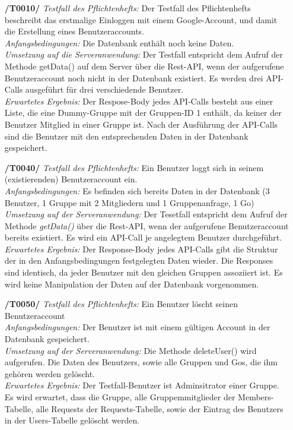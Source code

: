 \documentclass[11pt,a4paper]{scrartcl}
\begin{document}
\begin{enumerate}
	\item[\textbf{/T0010/}]
	\textit{Testfall des Pflichtenhefts: }Der Testfall des Pflichtenhefts beschreibt das erstmalige Einloggen mit einem Google-Account, und damit die Erstellung eines Benutzeraccounts.\\
	\textit{Anfangsbedingungen: }Die Datenbank enthält noch keine Daten.\\
	\textit{Umsetzung auf die Serveranwendung: }Der Testfall entspricht dem Aufruf der Methode getData() auf dem Server über die Rest-API, wenn der aufgerufene Benutzeraccount noch nicht in der Datenbank existiert. Es werden drei API-Calls ausgeführt für drei verschiedende Benutzer.\\
	\textit{Erwartetes Ergebnis: } Der Respose-Body jedes API-Calls besteht aus einer Liste, die eine Dummy-Gruppe mit der Gruppen-ID 1 enthält, da keiner der Benutzer Mitglied in einer Gruppe ist. Nach der Ausführung der API-Calls sind die Benutzer mit den entsprechenden Daten in der Datenbank gespeichert.
	
	\item[\textbf{/T0040/}]
	\textit{Testfall des Pflichtenhefts: }Ein Benutzer loggt sich in seinem (existierenden) Benutzeraccount ein.\\
	\textit{Anfangsbedingungen: }Es befinden sich bereits Daten in der Datenbank (3 Benutzer, 1 Gruppe mit 2 Mitgliedern und 1 Gruppenanfrage, 1 Go)\\
	\textit{Umsetzung auf der Serveranwendung: }Der Tesetfall entspricht dem Aufruf der Methode \textit{getData()} über die Rest-API, wenn der aufgerufene Benutzeraccount bereits existiert. Es wird ein API-Call je angelegtem Benutzer durchgeführt.\\
	\textit{Erwartetes Ergebnis: }Der Response-Body jedes API-Calls gibt die Struktur der in den Anfangsbedingungen festgelegten Daten wieder. Die Responses sind identisch, da jeder Benutzer mit den gleichen Gruppen assoziiert ist. Es wird keine Manipulation der Daten auf der Datenbank vorgenommen.
	
	\item[\textbf{/T0050/}]
	\textit{Testfall des Pflichtenhefts: }Ein Benutzer löscht seinen Benutzeraccount\\
	\textit{Anfangsbedingungen: }Der Benutzer ist mit einem gültigen Account in der Datenbank gespeichert.\\
	\textit{Umsetzung auf der Serveranwendung: }Die Methode deleteUser() wird aufgerufen. Die Daten des Benutzers, sowie alle Gruppen und Gos, die ihm gehören werden gelöscht.\\
	\textit{Erwartetes Ergebnis: }Der Testfall-Benutzer ist Adminsitrator einer Gruppe. Es wird erwartet, dass die Gruppe, alle Gruppemmitglieder der Members-Tabelle, alle Requests der Requests-Tabelle, sowie der Eintrag des Benutzers in der Users-Tabelle gelöscht werden.
	

\end{enumerate}
\end{document}
